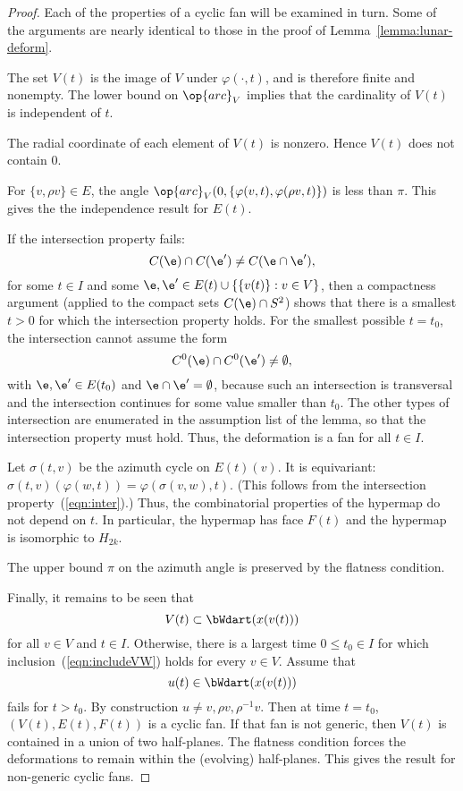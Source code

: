 \begin{proof}
Each of the properties of a cyclic fan will be examined in turn.  Some of the arguments are nearly identical to those in the proof of Lemma~\ref{lemma:lunar-deform}.

  The set $V(t)$ is the image of $V$ under $\varphi(\cdot,t)$, and is therefore finite and nonempty. The lower bound on $\op{arc}_V$ implies that the cardinality of $V(t)$ is independent of $t$.

  The radial coordinate of each element of $V(t)$ is nonzero.  Hence $V(t)$ does not contain $0$.

  For $\{v,\rho v\}\in E$, the angle 
$\op{arc}_V(0,\{\varphi(v,t),\varphi(\rho v,t)\})$ is less than $\pi$.
This gives the
the independence result for $E(t)$.

 If the intersection property fails:
$$
C(\e) \cap C(\e') \ne C(\e \cap \e'),
$$
for some $t\in I$ and some $\e,\e'\in E(t)\cup \{\{v(t)\}: v\in V\}$,
then a compactness argument (applied to the compact sets $C(\e)\cap S^2$)
shows that there is a smallest $t>0$ for which the intersection property
holds.  For the smallest possible $t=t_0$, the intersection cannot assume
the form
\begin{equation}\label{eqn:inter}
C^0(\e) \cap C^0(\e') \ne \emptyset,
\end{equation}
with $\e,\e'\in E(t_0)$ and $\e\cap \e'=\emptyset$, because such an intersection is transversal and the intersection continues for some value smaller than $t_0$.  The other types of intersection are enumerated in the assumption list of the lemma, so that the intersection property must hold.  Thus, the deformation is a fan for all $t\in I$.

   Let $\sigma(t,v)$ be the azimuth cycle on $E(t)(v)$.  It is equivariant:  $\sigma(t,v) (\varphi(w,t)) = \varphi(\sigma(v,w),t)$.   (This follows from the intersection property~(\ref{eqn:inter}).)  Thus, the combinatorial properties of the hypermap do not depend on $t$.  In particular, the hypermap has face $F(t)$ and the hypermap is isomorphic to $H_{2k}$.

  The upper bound $\pi$ on the azimuth angle is preserved by the flatness condition.

  Finally, it remains to be seen that 
\begin{equation}\label{eqn:includeVW}
V(t)\subset \bWdart(x(v(t)))
\end{equation} 
for all $v\in V$ and $t\in I$.  Otherwise, there is a largest time $0\le t_0\in I$ for which inclusion~(\ref{eqn:includeVW}) holds for every $v\in V$.  Assume that
$$
u(t)\in \bWdart(x(v(t)))
$$ 
fails for $t>t_0$.  By construction $u\ne v,\rho v,\rho^{-1} v$.  
Then at time $t=t_0$, $(V(t),E(t),F(t))$ is a cyclic fan.  If that fan is not generic, then $V(t)$ is contained in a union of two half-planes.  The flatness condition forces the deformations to remain within the (evolving) half-planes. This gives the result for non-generic cyclic fans.  


\end{proof}
